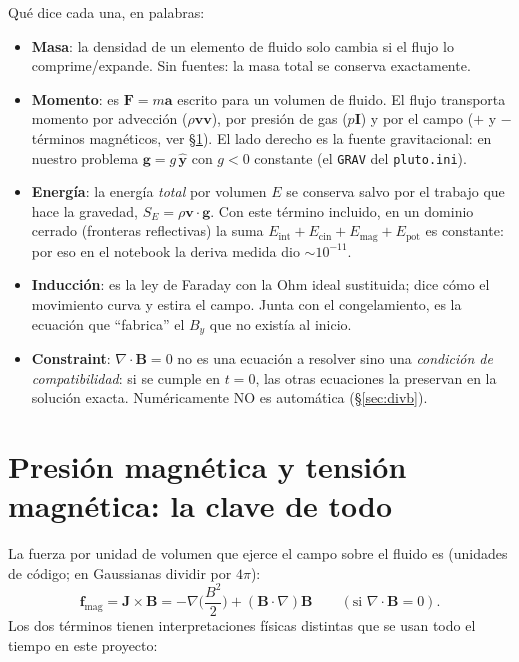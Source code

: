 \documentclass[11pt,a4paper]{article}
\newcommand{\B}{\mathbf{B}}
\newcommand{\vct}{\mathbf{v}}
\newcommand{\code}[1]{\texttt{#1}}
\begin{document}
Qué dice cada una, en palabras:
\begin{itemize}[nosep]
  \item \textbf{Masa}: la densidad de un elemento de fluido solo cambia si el flujo lo
  comprime/expande. Sin fuentes: la masa total se conserva exactamente.
  \item \textbf{Momento}: es $\mathbf{F}=m\mathbf{a}$ escrito para un volumen de fluido. El
  flujo transporta momento por advección ($\rho\vct\vct$), por presión de gas ($p\mathbf{I}$)
  y por el campo ($+$ y $-$ términos magnéticos, ver \S\ref{sec:maxwell}). El lado derecho
  es la fuente gravitacional: en nuestro problema $\mathbf{g}=g\,\hat{\mathbf{y}}$ con
  $g<0$ constante (el \code{GRAV} del \code{pluto.ini}).
  \item \textbf{Energía}: la energía \emph{total} por volumen $E$ se conserva salvo por el
  trabajo que hace la gravedad, $S_E=\rho\vct\cdot\mathbf{g}$. Con este término incluido,
  en un dominio cerrado (fronteras reflectivas) la suma
  $E_\mathrm{int}+E_\mathrm{cin}+E_\mathrm{mag}+E_\mathrm{pot}$ es constante: por eso en el
  notebook la deriva medida dio $\sim10^{-11}$.
  \item \textbf{Inducción}: es la ley de Faraday con la Ohm ideal sustituida; dice cómo el
  movimiento curva y estira el campo. Junta con el congelamiento, es la ecuación que
  ``fabrica'' el $B_y$ que no existía al inicio.
  \item \textbf{Constraint}: $\nabla\cdot\B=0$ no es una ecuación a resolver sino una
  \emph{condición de compatibilidad}: si se cumple en $t=0$, las otras ecuaciones la
  preservan en la solución exacta. Numéricamente NO es automática (\S\ref{sec:divb}).
\end{itemize}

\section{Presión magnética y tensión magnética: la clave de todo}
\label{sec:maxwell}

La fuerza por unidad de volumen que ejerce el campo sobre el fluido es (unidades de código;
en Gaussianas dividir por $4\pi$):
\begin{equation}
\mathbf{f}_\mathrm{mag} = \mathbf{J}\times\B = -\nabla\Big(\frac{B^2}{2}\Big)
+ (\B\cdot\nabla)\B
\qquad (\text{si } \nabla\cdot\B=0).
\end{equation}
Los dos términos tienen interpretaciones físicas distintas que se usan todo el tiempo en
este proyecto:
\end{document}
